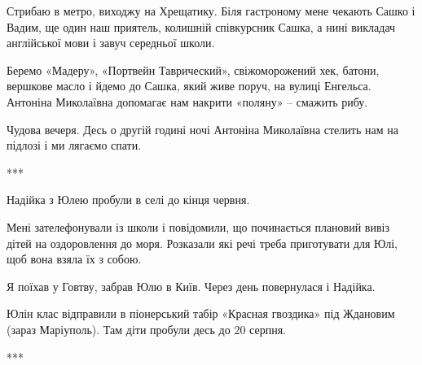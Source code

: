 Стрибаю в метро, виходжу на Хрещатику. Біля гастроному мене чекають Сашко і
Вадим, ще один наш приятель, колишній співкурсник Сашка, а нині викладач
англійської мови і завуч середньої школи. 

Беремо «Мадеру», «Портвейн Таврический», свіжоморожений хек, батони, вершкове
масло і йдемо до Сашка, який живе поруч, на вулиці Енгельса. Антоніна
Миколаївна допомагає нам накрити «поляну» – смажить рибу. 

Чудова вечеря. Десь о другій годині ночі Антоніна Миколаївна стелить нам на
підлозі і ми лягаємо спати.

***

Надійка з Юлею пробули в селі до кінця червня. 

Мені зателефонували із школи і повідомили, що починається плановий вивіз дітей
на оздоровлення до моря. Розказали які речі треба приготувати для Юлі, щоб вона
взяла їх з собою.

Я поїхав у Говтву, забрав Юлю в Київ. Через день повернулася і Надійка. 

Юлін клас відправили в піонерський табір «Красная гвоздика» під Ждановим (зараз
Маріуполь). Там діти пробули десь до 20 серпня.

***
